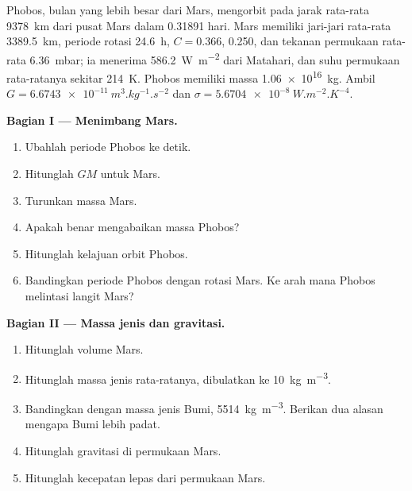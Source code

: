 \begin{problem}
\label{pb:b1:comparative-planetology:1}
Phobos, bulan yang lebih besar dari Mars, mengorbit pada jarak rata-rata \qty{9378}{km} dari pusat Mars dalam \num{0.31891} hari. Mars memiliki jari-jari rata-rata \qty{3389.5}{km}, periode rotasi \qty{24.6}{h},  $C = 0.366$,  0.250, dan tekanan permukaan rata-rata \qty{6.36}{mbar}; ia menerima \qty{586.2}{W.m^{-2}} dari Matahari, dan suhu permukaan rata-ratanya sekitar \qty{214}{K}. Phobos memiliki massa \qty{1.06e16}{kg}. Ambil $G = \qty{6.6743e-11}{m^3.kg^{-1}.s^{-2}}$ dan $\sigma = \qty{5.6704e-8}{W.m^{-2}.K^{-4}}$.

\medskip
\noindent\textbf{Bagian I --- Menimbang Mars.}
\begin{enumerate}
  \item Ubahlah periode Phobos ke detik.
  \item Hitunglah $GM$ untuk Mars.
  \item Turunkan massa Mars.
  \item Apakah benar mengabaikan massa Phobos?
  \item Hitunglah kelajuan orbit Phobos.
  \item Bandingkan periode Phobos dengan rotasi Mars. Ke arah mana Phobos melintasi langit Mars?
\end{enumerate}

\medskip
\noindent\textbf{Bagian II --- Massa jenis dan gravitasi.}
\begin{enumerate}[resume]
  \item Hitunglah volume Mars.
  \item Hitunglah massa jenis rata-ratanya, dibulatkan ke \qty{10}{kg.m^{-3}}.
  \item Bandingkan dengan massa jenis Bumi, \qty{5514}{kg.m^{-3}}. Berikan dua alasan mengapa Bumi lebih padat.
  \item Hitunglah gravitasi di permukaan Mars.
  \item Hitunglah kecepatan lepas dari permukaan Mars.
\end{enumerate}


\end{problem}
